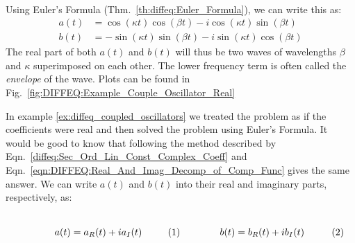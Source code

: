 \begin{fexample}
\begin{align}
                \end{align}
                Using Euler's Formula
                (Thm.~\ref{th:diffeq:Euler_Formula}),
                we can write this as:
                \begin{subequations}
                    \begin{align}
                        a(t)&=\cos(\kappa{t})\cos(\beta{t})
                        -i\cos(\kappa{t})\sin(\beta{t})\\
                        b(t)&=-\sin(\kappa{t})\sin(\beta{t})
                        -i\sin(\kappa{t})\cos(\beta{t})
                    \end{align}
                \end{subequations}
                The real part of both $a(t)$ and $b(t)$ will thus
                be two waves of wavelengths $\beta$ and $\kappa$
                superimposed on each other.
                The lower frequency term is often called the
                \textit{envelope} of the wave.
                Plots can be found in
                Fig.~\ref{fig:DIFFEQ:Example_Couple_Oscillator_Real}
            \end{fexample}
            In example \ref{ex:diffeq_coupled_oscillators}
            we treated the problem as if the coefficients were real
            and then solved the problem using Euler's Formula.
            It would be good to know that following the method
            described by
            Eqn.~\ref{diffeq:Sec_Ord_Lin_Const_Complex_Coeff} and
            Eqn.~\ref{eqn:DIFFEQ:Real_And_Imag_Decomp_of_Comp_Func}
            gives the same answer.
            We can write $a(t)$ and $b(t)$ into their real and
            imaginary parts, respectively, as:
            \par
            \begin{subequations}
                \begin{minipage}[b]{0.49\textwidth}
                    \centering
                    \begin{equation}
                        a(t)=a_{R}(t)+ia_{I}(t)
                    \end{equation}
                \end{minipage}
                \hfill
                \begin{minipage}[b]{0.49\textwidth}
                    \centering
                    \begin{equation}
                        b(t)=b_{R}(t)+ib_{I}(t)
                    \end{equation}
                \end{minipage}
            \end{subequations}
